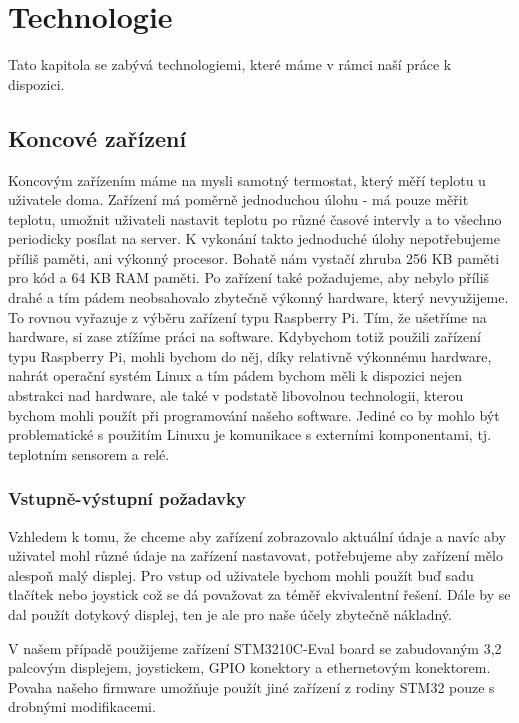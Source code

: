 \section{Technologie}
Tato kapitola se zabývá technologiemi, které máme v rámci naší práce k dispozici.

\subsection{Koncové zařízení}
Koncovým zařízením máme na mysli samotný termostat, který měří teplotu u uživatele doma.
Zařízení má poměrně jednoduchou úlohu - má pouze měřit teplotu, umožnit uživateli nastavit teplotu po
různé časové intervly a to všechno periodicky posílat na server.
K vykonání takto jednoduché úlohy nepotřebujeme příliš paměti, ani výkonný procesor.
Bohatě nám vystačí zhruba 256 KB paměti pro kód a 64 KB RAM paměti.
Po zařízení také požadujeme, aby nebylo příliš drahé a tím pádem neobsahovalo zbytečně výkonný
hardware, který nevyužijeme.
To rovnou vyřazuje z výběru zařízení typu Raspberry Pi.
Tím, že ušetříme na hardware, si zase ztížíme práci na software.
Kdybychom totiž použili zařízení typu Raspberry Pi, mohli bychom do něj, díky relativně
výkonnému hardware, nahrát operační systém Linux a tím pádem bychom měli k dispozici nejen
abstrakci nad hardware, ale také v podstatě libovolnou technologii, kterou bychom mohli použít
při programování našeho software.
Jediné co by mohlo být problematické s použitím Linuxu je komunikace s externími komponentami, tj.
teplotním sensorem a relé.


\subsubsection{Vstupně-výstupní požadavky}
Vzhledem k tomu, že chceme aby zařízení zobrazovalo aktuální údaje a navíc aby uživatel mohl
různé údaje na zařízení nastavovat, potřebujeme aby zařízení mělo alespoň malý displej.
Pro vstup od uživatele bychom mohli použít buď sadu tlačítek nebo joystick což se dá považovat
za téměř ekvivalentní řešení.
Dále by se dal použít dotykový displej, ten je ale pro naše účely zbytečně nákladný.

V našem případě použijeme zařízení STM3210C-Eval board \cite{STM3210C-Eval} se zabudovaným 3,2 palcovým displejem,
joystickem, GPIO konektory a ethernetovým konektorem.
Povaha našeho firmware umožňuje použít jiné zařízení z rodiny STM32 pouze s drobnými modifikacemi.

